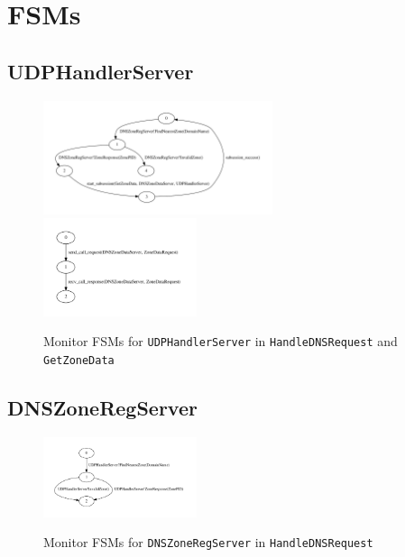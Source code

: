 \documentclass[a4paper]{article}
\begin{document}
\section{FSMs}
\subsection{UDPHandlerServer}
\begin{figure}[H]
\includegraphics[width=0.6\textwidth]{handledns_udphandlerserver_dot.pdf}
\includegraphics[width=0.4\textwidth]{getzonedata_udphandlerserver_dot.pdf}
\label{fsm-udphandlerserver}
\caption{Monitor FSMs for \texttt{UDPHandlerServer} in \texttt{HandleDNSRequest} and \texttt{GetZoneData}}
\end{figure}

\subsection{DNSZoneRegServer}
\begin{figure}[H]
\centering
\includegraphics[width=0.4\textwidth]{handledns_zoneregserver_dot.pdf}
\label{fsm-zoneregserver}
\caption{Monitor FSMs for \texttt{DNSZoneRegServer} in \texttt{HandleDNSRequest}}
\end{figure}
\end{document}
